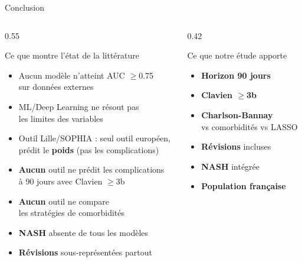 \documentclass[aspectratio=169]{beamer}
\newcommand{\tightlist}{%
  \setlength{\itemsep}{1pt}\setlength{\parskip}{0pt}%
  \setlength{\parsep}{0pt}\setlength{\topsep}{2pt}}
\begin{document}
\begin{frame}{Conclusion}
  \begin{columns}[T]
    \begin{column}{0.55\textwidth}
      \begin{block}{Ce que montre l'état de la littérature}
        \footnotesize\tightlist
        \begin{itemize}\tightlist
          \item Aucun modèle n'atteint AUC $\geq$0.75\\
                sur données externes
          \item ML/Deep Learning ne résout pas\\
                les limites des variables
          \item Outil Lille/SOPHIA : seul outil européen,\\
                prédit le \textbf{poids} (pas les complications)
          \item \textbf{Aucun} outil ne prédit les complications\\
                à 90 jours avec Clavien $\geq$3b
          \item \textbf{Aucun} outil ne compare\\
                les stratégies de comorbidités
          \item \textbf{NASH} absente de tous les modèles
          \item \textbf{Révisions} sous-représentées partout
        \end{itemize}
      \end{block}
    \end{column}
    \begin{column}{0.42\textwidth}
      \begin{alertblock}{Ce que notre étude apporte}
        \footnotesize\tightlist
        \begin{itemize}\tightlist
          \item \textbf{Horizon 90 jours}
          \item \textbf{Clavien $\geq$3b}
          \item \textbf{Charlson-Bannay}\\
                vs comorbidités vs LASSO
          \item \textbf{Révisions} incluses
          \item \textbf{NASH} intégrée
          \item \textbf{Population française}

\end{itemize}
\end{alertblock}
\end{column}
\end{columns}
\end{frame}
\end{document}
